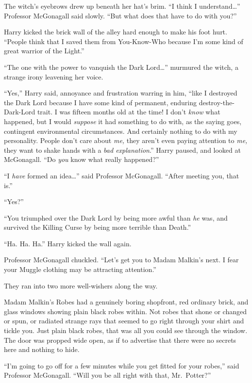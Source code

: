 The witch's eyebrows drew up beneath her hat's brim. ``I think I
understand\ldots{}'' Professor McGonagall said slowly. ``But what does
that have to do with you?''

Harry kicked the brick wall of the alley hard enough to make his foot
hurt. ``People think that I saved them from You-Know-Who because I'm
some kind of great warrior of the Light.''

``The one with the power to vanquish the Dark Lord\ldots{}'' murmured
the witch, a strange irony leavening her voice.

``Yes,'' Harry said, annoyance and frustration warring in him, ``like I
destroyed the Dark Lord because I have some kind of permanent, enduring
destroy-the-Dark-Lord trait. I was fifteen months old at the time! I
don't \emph{know} what happened, but I would \emph{suppose} it had
something to do with, as the saying goes, contingent environmental
circumstances. And certainly nothing to do with my personality. People
don't care about \emph{me,} they aren't even paying attention to
\emph{me,} they want to shake hands with a \emph{bad explanation}.''
Harry paused, and looked at McGonagall. ``Do \emph{you} know what really
happened?''

``I \emph{have} formed an idea\ldots{}'' said Professor McGonagall.
``After meeting you, that is.''

``Yes?''

``You triumphed over the Dark Lord by being more awful than \emph{he}
was, and survived the Killing Curse by being more terrible than Death.''

``Ha. Ha. Ha.'' Harry kicked the wall again.

Professor McGonagall chuckled. ``Let's get you to Madam Malkin's next. I
fear your Muggle clothing may be attracting attention.''

They ran into two more well-wishers along the way.

Madam Malkin's Robes had a genuinely boring shopfront, red ordinary
brick, and glass windows showing plain black robes within. Not robes
that shone or changed or spun, or radiated strange rays that seemed to
go right through your shirt and tickle you. Just plain black robes, that
was all you could see through the window. The door was propped wide
open, as if to advertise that there were no secrets here and nothing to
hide.

``I'm going to go off for a few minutes while you get fitted for your
robes,'' said Professor McGonagall. ``Will you be all right with that,
Mr.~Potter?''

